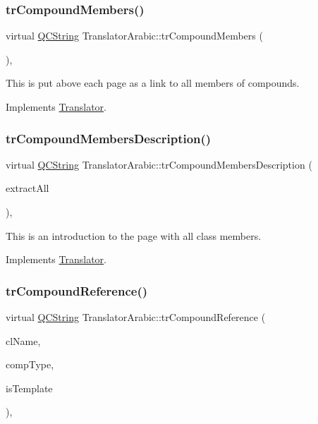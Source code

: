 \subsubsection{\texorpdfstring{trCompoundMembers()}{trCompoundMembers()}}
{\footnotesize\ttfamily virtual \mbox{\hyperlink{class_q_c_string}{Q\+C\+String}} Translator\+Arabic\+::tr\+Compound\+Members (\begin{DoxyParamCaption}{ }\end{DoxyParamCaption})\hspace{0.3cm}{\ttfamily [inline]}, {\ttfamily [virtual]}}

This is put above each page as a link to all members of compounds. 

Implements \mbox{\hyperlink{class_translator}{Translator}}.

\mbox{\label{class_translator_arabic_a2ed218e5796759be5e85b7214f8f9d15}} 
\subsubsection{\texorpdfstring{trCompoundMembersDescription()}{trCompoundMembersDescription()}}
{\footnotesize\ttfamily virtual \mbox{\hyperlink{class_q_c_string}{Q\+C\+String}} Translator\+Arabic\+::tr\+Compound\+Members\+Description (\begin{DoxyParamCaption}\item[{bool}]{extract\+All }\end{DoxyParamCaption})\hspace{0.3cm}{\ttfamily [inline]}, {\ttfamily [virtual]}}

This is an introduction to the page with all class members. 

Implements \mbox{\hyperlink{class_translator}{Translator}}.

\mbox{\label{class_translator_arabic_a85e631bcd4aa1799bbf8d45c7ccdda00}} 
\subsubsection{\texorpdfstring{trCompoundReference()}{trCompoundReference()}}
{\footnotesize\ttfamily virtual \mbox{\hyperlink{class_q_c_string}{Q\+C\+String}} Translator\+Arabic\+::tr\+Compound\+Reference (\begin{DoxyParamCaption}\item[{const char $\ast$}]{cl\+Name,  }\item[{\mbox{\hyperlink{class_class_def_ae70cf86d35fe954a94c566fbcfc87939}{Class\+Def\+::\+Compound\+Type}}}]{comp\+Type,  }\item[{bool}]{is\+Template }\end{DoxyParamCaption})\hspace{0.3cm}{\ttfamily [inline]}, {\ttfamily [virtual]}}

